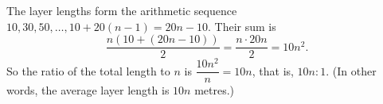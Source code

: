 The layer lengths form the arithmetic sequence $10,30,50,\dots,10+20(n-1)=20n-10$. Their sum is
\[\dfrac{n\left(10+(20n-10)\right)}{2}=\dfrac{n\cdot20n}{2}=10n^2 .\]
So the ratio of the total length to $n$ is $\dfrac{10n^2}{n}=\boxed{10n}$, that is, $10n:1$. (In other words, the average layer length is $10n$ metres.)
